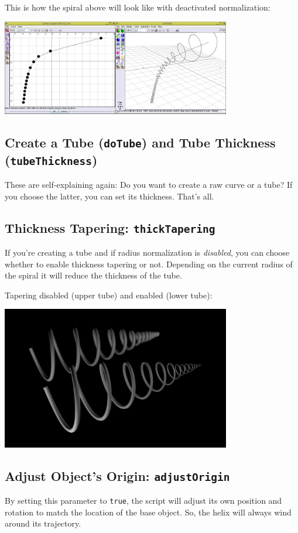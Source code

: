 \documentclass[12pt,a4paper]{scrartcl}
\begin{document}
\pagebreak

This is how the spiral above will look like with deactivated normalization:
\begin{center}
	\includegraphics[width=0.75\textwidth]{../pics/dichte-comp-2.jpg}
\end{center}

\subsection{Create a Tube (\texttt{doTube}) and Tube Thickness (\texttt{tubeThickness})}
These are self-explaining again: Do you want to create a raw curve or
a tube? If you choose the latter, you can set its thickness. That's all.

\subsection{Thickness Tapering: \texttt{thickTapering}}
If you're creating a tube and if radius normalization is \emph{disabled},
you can choose whether to enable thickness tapering or not. Depending
on the current radius of the spiral it will reduce the thickness of the
tube.

Tapering disabled (upper tube) and enabled (lower tube):
\begin{center}
	\includegraphics[width=0.75\textwidth]{../pics/thicknessTapering.jpg}
\end{center}

\subsection{Adjust Object's Origin: \texttt{adjustOrigin}}
By setting this parameter to \texttt{true}, the script will adjust its own
position and rotation to match the location of the base object. So,
the helix will always wind around its trajectory.
\end{document}

